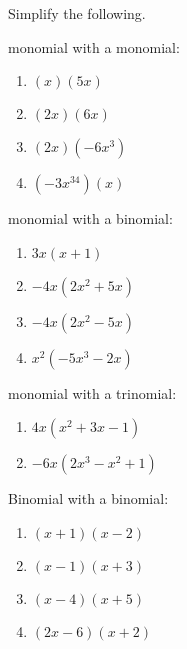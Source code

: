 \begin{myexample}
Simplify the following.
\drillandskill
	
monomial with a monomial:
\begin{enumerate}
	\item $(x)(5x)$ 
	\item $(2x)(6x)$ 
	\item $(2x)(-6x^3)$ 
	\item $(-3x^{34})(x)$ 
\end{enumerate}
	
monomial with a binomial:
\begin{enumerate}
	\item $3x(x+1)$ 
	\item $-4x(2x^2+5x)$ 
	\item $-4x(2x^2-5x)$ 
	\item $x^2(-5x^3-2x)$ 
\end{enumerate}
	
monomial with a trinomial:
\begin{enumerate}
	\item $4x(x^2+3x-1)$ 
	\item $-6x(2x^3-x^2+1)$ 
\end{enumerate}
	
Binomial with a binomial:
\begin{enumerate}
	\item $(x+1)(x-2)$ 
	\item $(x-1)(x+3)$ 
	\item $(x-4)(x+5)$ 
	\item $(2x-6)(x+2)$
\end{enumerate}	
\end{myexample}


